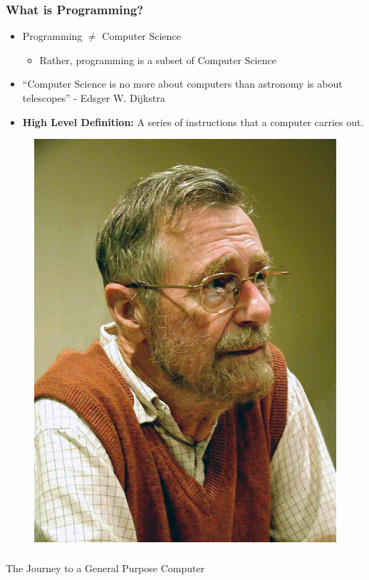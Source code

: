 \documentclass{beamer}
\begin{document}
%
%
\begin{frame}
  \frametitle{What is Programming?}
  \begin{minipage}{0.49\textwidth}
    \begin{itemize}
      \item Programming $\neq$ Computer Science
        \begin{itemize}
          \item Rather, programming is a subset of Computer Science
        \end{itemize}
      \item ``Computer Science is no more about computers than astronomy is about telescopes'' - Edsger W. Dijkstra
      \item \textbf{High Level Definition: } A series of instructions that a computer carries out.
    \end{itemize}
  \end{minipage}
  \begin{minipage}{0.49\textwidth}
    \begin{figure}
      \includegraphics[width=.5\textwidth]{./imgs/dijkstra.jpg}
      \label{fig:dijkstra}
    \end{figure}
  \end{minipage}
\end{frame}

%
%
%
\begin{frame}
  \frametitle{}
  \centering
  \Huge The Journey to a General Purpose Computer
\end{frame}
\end{document}
